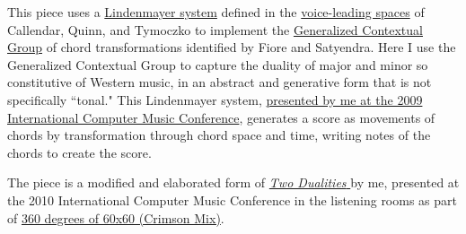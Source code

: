\documentclass[letterpaper,10pt,DIV=12,parskip=half]{scrartcl}
\begin{document}
This piece uses a \href{https://algorithmicbotany.org/papers/abop/abop.pdf}{Lindenmayer system} defined in the \href{https://dmitri.mycpanel.princeton.edu/files/publications/science2.pdf}{voice-leading spaces} of Callendar, Quinn, and Tymoczko to implement the \href{https://www.mtosmt.org/issues/mto.05.11.3/mto.05.11.3.fiore_satyendra.pdf}{Generalized Contextual Group} of chord transformations identified by Fiore and Satyendra. Here I use the Generalized Contextual Group to capture the duality of major and minor so constitutive of Western music, in an abstract and generative form that is not specifically ``tonal." This Lindenmayer system, \href{https://citeseerx.ist.psu.edu/document?repid=rep1&type=pdf&doi=dd8623bbe8c889b2c56d6a1fc0fc55c61b362ee4}{presented by me at the 2009 International Computer Music Conference}, generates a score as movements of chords by transformation through chord space and time, writing notes of the chords to create the score. 

The piece is a modified and elaborated form of \href{https://music.youtube.com/watch?v=3_ahbL44p-E}{\emph{Two Dualities} }by me, presented at the 2010 International Computer Music Conference in the listening rooms as part of \href{http://www.voxnovus.com/60x60/2010_Crimson_Mix.htm}{360 degrees of 60x60 (Crimson Mix)}.
\end{document}
